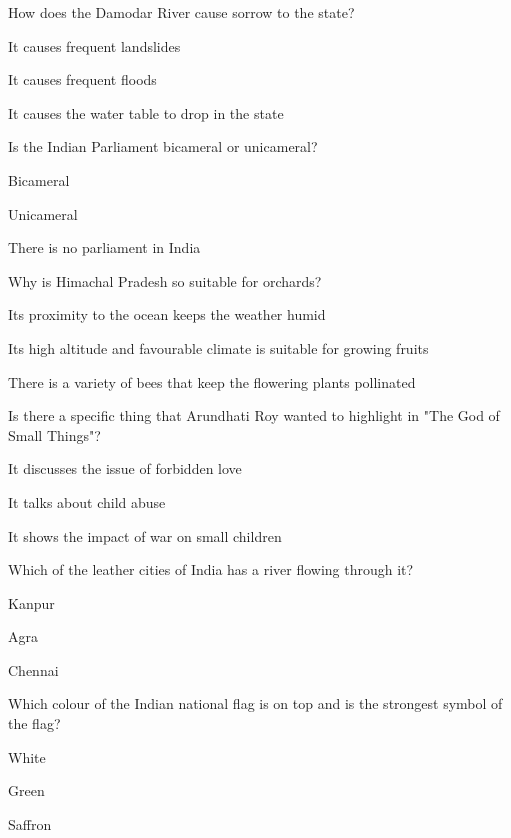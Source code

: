 \begin{enhancedmcq}{How does the Damodar River cause sorrow to the state?}
\item It causes frequent landslides
\item It causes frequent floods
\item It causes the water table to drop in the state

\end{enhancedmcq}
\begin{enhancedmcq}{Is the Indian Parliament bicameral or unicameral?}
\item Bicameral
\item Unicameral
\item There is no parliament in India

\end{enhancedmcq}
\begin{enhancedmcq}{Why is Himachal Pradesh so suitable for orchards?}
\item Its proximity to the ocean keeps the weather humid
\item Its high altitude and favourable climate is suitable for growing fruits
\item There is a variety of bees that keep the flowering plants pollinated

\end{enhancedmcq}
\begin{enhancedmcq}{Is there a specific thing that Arundhati Roy wanted to highlight in "The God of Small Things"?}
\item It discusses the issue of forbidden love
\item It talks about child abuse
\item It shows the impact of war on small children

\end{enhancedmcq}
\begin{enhancedmcq}{Which of the leather cities of India has a river flowing through it?}
\item Kanpur
\item Agra
\item Chennai

\end{enhancedmcq}
\begin{enhancedmcq}{Which colour of the Indian national flag is on top and is the strongest symbol of the flag?}
\item White
\item Green
\item Saffron

\end{enhancedmcq}

